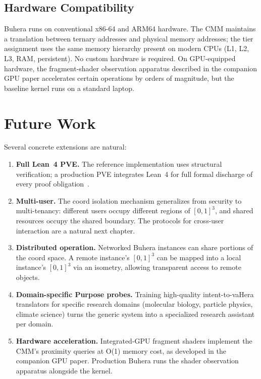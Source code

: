 \documentclass[11pt,twocolumn,a4paper]{article}
\begin{document}
\subsection{Hardware Compatibility}

Buhera runs on conventional x86-64 and ARM64 hardware. The CMM maintains a translation between ternary addresses and physical memory addresses; the tier assignment uses the same memory hierarchy present on modern CPUs (L1, L2, L3, RAM, persistent). No custom hardware is required. On GPU-equipped hardware, the fragment-shader observation apparatus described in the companion GPU paper accelerates certain operations by orders of magnitude, but the baseline kernel runs on a standard laptop.


\section{Future Work}
\label{sec:future}

Several concrete extensions are natural:

\begin{enumerate}[leftmargin=*]
\item \textbf{Full Lean~4 PVE.} The reference implementation uses structural verification; a production PVE integrates Lean~4 for full formal discharge of every proof obligation~\cite{demoura2015lean,moura2021lean4}.

\item \textbf{Multi-user.} The coord isolation mechanism generalizes from security to multi-tenancy: different users occupy different regions of $[0,1]^3$, and shared resources occupy the shared boundary. The protocols for cross-user interaction are a natural next chapter.

\item \textbf{Distributed operation.} Networked Buhera instances can share portions of the coord space. A remote instance's $[0,1]^3$ can be mapped into a local instance's $[0,1]^3$ via an isometry, allowing transparent access to remote objects.

\item \textbf{Domain-specific Purpose probes.} Training high-quality intent-to-vaHera translators for specific research domains (molecular biology, particle physics, climate science) turns the generic system into a specialized research assistant per domain.

\item \textbf{Hardware acceleration.} Integrated-GPU fragment shaders implement the CMM's proximity queries at O(1) memory cost, as developed in the companion GPU paper. Production Buhera runs the shader observation apparatus alongside the kernel.
\end{enumerate}
\end{document}
